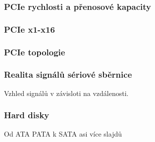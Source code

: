 \documentclass{beamer}
\begin{document}
\begin{frame}
\frametitle{PCIe rychlosti a přenosové kapacity}

\end{frame}

\begin{frame}
\frametitle{PCIe x1-x16}

\end{frame}



\begin{frame}
\frametitle{PCIe topologie}

\end{frame}

\begin{frame}
\frametitle{Realita signálů sériové sběrnice}

Vzhled signálů v závisloti na vzdálenosti.

\end{frame}


\begin{frame}
\frametitle{Hard disky}

Od ATA PATA k SATA
asi více slajdů
\end{frame}
\end{document}
